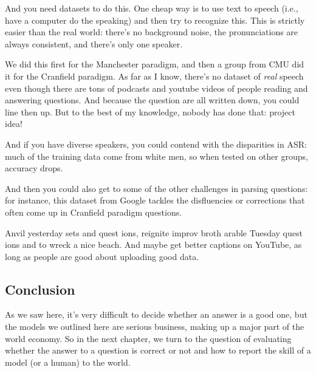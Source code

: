 And you need datasets to do this.  One cheap way is to use text to speech (i.e., have a computer do the speaking) and then try to recognize this.  This is strictly easier than the real world: there’s no background noise, the pronunciations are always consistent, and there’s only one speaker.

We did this first for the Manchester paradigm, and then a group from CMU did it for the Cranfield paradigm.  As far as I know, there’s no dataset of \emph{real} speech even though there are tons of podcasts and youtube videos of people reading and answering questions.  And because the question are all written down, you could line then up.  But to the best of my knowledge, nobody has done that: project idea!

And if you have diverse speakers, you could contend with the disparities in ASR: much of the training data come from white men, so when tested on other groups, accuracy drops.

And then you could also get to some of the other challenges in parsing questions: for instance, this dataset from Google tackles the disfluencies or corrections that often come up in Cranfield paradigm questions.

Anvil yesterday sets and quest ions, reignite improv broth arable Tuesday quest ions and to wreck a nice beach.  And maybe get better captions on YouTube, as long as people are good about uploading good data.


\subsection{Conclusion}

As we saw here, it's very difficult to decide whether an answer is a good one, but the models we outlined here are serious business, making up a major part of the world economy.  
%
So in the next chapter, we turn to the question of evaluating whether the answer to a question is correct or not and how to report the skill of a model (or a human) to the world.





